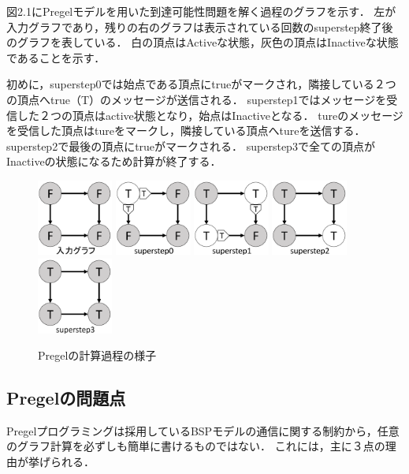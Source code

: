 \documentclass[12pt]{ujreport}
\begin{document}
図2.1にPregelモデルを用いた到達可能性問題を解く過程のグラフを示す．
左が入力グラフであり，残りの右のグラフは表示されている回数のsuperstep終了後のグラフを表している．
白の頂点はActiveな状態，灰色の頂点はInactiveな状態であることを示す．

初めに，superstep0では始点である頂点にtrueがマークされ，隣接している２つの頂点へtrue（T）のメッセージが送信される．
superstep1ではメッセージを受信した２つの頂点はactive状態となり，始点はInactiveとなる．
tureのメッセージを受信した頂点はtureをマークし，隣接している頂点へtureを送信する．
superstep2で最後の頂点にtrueがマークされる．
superstep3で全ての頂点がInactiveの状態になるため計算が終了する．

\begin{figure}[ht]
  \centering
  \includegraphics[width=2.5cm]{入力.pdf}
  \includegraphics[width=2.5cm]{ss0.pdf}
  \includegraphics[width=2.5cm]{ss1.pdf}
  \includegraphics[width=2.5cm]{ss2.pdf}
  \includegraphics[width=2.5cm]{ss3.pdf}
\caption{Pregelの計算過程の様子}
\end{figure}

\subsection{Pregelの問題点}
Pregelプログラミングは採用しているBSPモデルの通信に関する制約から，任意のグラフ計算を必ずしも簡単に書けるものではない．
これには，主に３点の理由が挙げられる．
\end{document}
